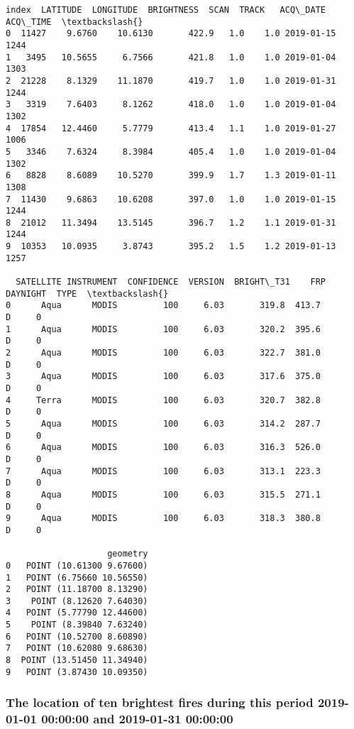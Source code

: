 \documentclass[11pt,a4paper]{article}
\makeatletter
\newcommand{\boxspacing}{\kern\kvtcb@left@rule\kern\kvtcb@boxsep}
\newcommand{\prompt}[4]{
        {\ttfamily\llap{{\color{#2}[#3]:\hspace{3pt}#4}}\vspace{-\baselineskip}}
    }
\makeatother
\begin{document}
            \begin{tcolorbox}[breakable, size=fbox, boxrule=.5pt, pad at break*=1mm, opacityfill=0]
\prompt{Out}{outcolor}{10}{\boxspacing}
\begin{Verbatim}[commandchars=\\\{\}]
   index  LATITUDE  LONGITUDE  BRIGHTNESS  SCAN  TRACK   ACQ\_DATE  ACQ\_TIME  \textbackslash{}
0  11427    9.6760    10.6130       422.9   1.0    1.0 2019-01-15      1244
1   3495   10.5655     6.7566       421.8   1.0    1.0 2019-01-04      1303
2  21228    8.1329    11.1870       419.7   1.0    1.0 2019-01-31      1244
3   3319    7.6403     8.1262       418.0   1.0    1.0 2019-01-04      1302
4  17854   12.4460     5.7779       413.4   1.1    1.0 2019-01-27      1006
5   3346    7.6324     8.3984       405.4   1.0    1.0 2019-01-04      1302
6   8828    8.6089    10.5270       399.9   1.7    1.3 2019-01-11      1308
7  11430    9.6863    10.6208       397.0   1.0    1.0 2019-01-15      1244
8  21012   11.3494    13.5145       396.7   1.2    1.1 2019-01-31      1244
9  10353   10.0935     3.8743       395.2   1.5    1.2 2019-01-13      1257

  SATELLITE INSTRUMENT  CONFIDENCE  VERSION  BRIGHT\_T31    FRP DAYNIGHT  TYPE  \textbackslash{}
0      Aqua      MODIS         100     6.03       319.8  413.7        D     0
1      Aqua      MODIS         100     6.03       320.2  395.6        D     0
2      Aqua      MODIS         100     6.03       322.7  381.0        D     0
3      Aqua      MODIS         100     6.03       317.6  375.0        D     0
4     Terra      MODIS         100     6.03       320.7  382.8        D     0
5      Aqua      MODIS         100     6.03       314.2  287.7        D     0
6      Aqua      MODIS         100     6.03       316.3  526.0        D     0
7      Aqua      MODIS         100     6.03       313.1  223.3        D     0
8      Aqua      MODIS         100     6.03       315.5  271.1        D     0
9      Aqua      MODIS         100     6.03       318.3  380.8        D     0

                    geometry
0   POINT (10.61300 9.67600)
1   POINT (6.75660 10.56550)
2   POINT (11.18700 8.13290)
3    POINT (8.12620 7.64030)
4   POINT (5.77790 12.44600)
5    POINT (8.39840 7.63240)
6   POINT (10.52700 8.60890)
7   POINT (10.62080 9.68630)
8  POINT (13.51450 11.34940)
9   POINT (3.87430 10.09350)
\end{Verbatim}
\end{tcolorbox}
        
    \hypertarget{the-location-of-ten-brightest-fires-during-this-period-2019-01-01-000000-and-2019-01-31-000000}{%
\subsubsection{The location of ten brightest fires during this
period 2019-01-01 00:00:00 and 2019-01-31
00:00:00}\label{the-location-of-ten-brightest-fires-during-this-period-2019-01-01-000000-and-2019-01-31-000000}}
\end{document}
